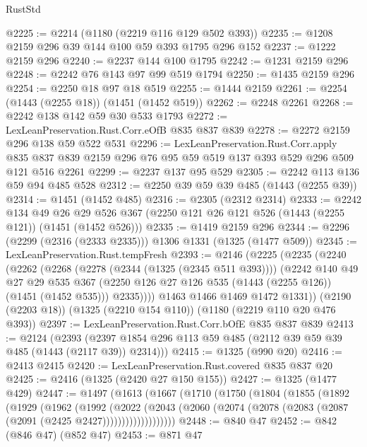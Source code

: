 \begin{lexlean}{RustStd}
\begin{coremodule}
{\begin{coremodule}
{{{{{{{{{@2225 := @2214 (@1180 (@2219 @116 @129 @502 @393))
@2235 := @1208 @2159 @296 @39 @144 @100 @59 @393 @1795 @296 @152
@2237 := @1222 @2159 @296
@2240 := @2237 @144 @100 @1795
@2242 := @1231 @2159 @296
@2248 := @2242 @76 @143 @97 @99 @519 @1794
@2250 := @1435 @2159 @296
@2254 := @2250 @18 @97 @18 @519
@2255 := @1444 @2159
@2261 := @2254 (@1443 (@2255 @18)) (@1451 (@1452 @519))
@2262 := @2248 @2261
@2268 := @2242 @138 @142 @59 @30 @533 @1793
@2272 := LexLeanPreservation.Rust.Corr.eOfB @835 @837 @839
@2278 := @2272 @2159 @296 @138 @59 @522 @531
@2296 := LexLeanPreservation.Rust.Corr.apply
    @835
    @837
    @839
    @2159
    @296
    @76
    @95
    @59
    @519
    @137
    @393
    @529
    @296
    @509
    @121
    @516
    @2261
@2299 := @2237 @137 @95 @529
@2305 := @2242 @113 @136 @59 @94 @485 @528
@2312 := @2250 @39 @59 @39 @485 (@1443 (@2255 @39))
@2314 := @1451 (@1452 @485)
@2316 := @2305 (@2312 @2314)
@2333 := @2242
    @134
    @49
    @26
    @29
    @526
    @367
    (@2250 @121 @26 @121 @526 (@1443 (@2255 @121)) (@1451 (@1452 @526)))
@2335 := @1419 @2159 @296
@2344 := @2296 (@2299 (@2316 (@2333 @2335))) @1306 @1331 (@1325 (@1477 @509))
@2345 := LexLeanPreservation.Rust.tempFresh
@2393 := @2146
    (@2225
      (@2235
        (@2240
          (@2262
            (@2268
              (@2278 (@2344 (@1325 (@2345 @511 @393))))
              (@2242
                @140
                @49
                @27
                @29
                @535
                @367
                (@2250 @126 @27 @126 @535 (@1443 (@2255 @126)) (@1451 (@1452 @535)))
                @2335))))
        @1463
        @1466
        @1469
        @1472
        @1331))
    (@2190 (@2203 @18))
    (@1325 (@2210 @154 @110))
    (@1180 (@2219 @110 @20 @476 @393))
@2397 := LexLeanPreservation.Rust.Corr.bOfE @835 @837 @839
@2413 := @2124
    (@2393 (@2397 @1854 @296 @113 @59 @485 (@2112 @39 @59 @39 @485 (@1443 (@2117 @39)) @2314)))
@2415 := @1325 (@990 @20)
@2416 := @2413 @2415
@2420 := LexLeanPreservation.Rust.covered @835 @837 @20
@2425 := @2416 (@1325 (@2420 @27 @150 @155))
@2427 := @1325 (@1477 @429)
@2447 := @1497
    (@1613
      (@1667
        (@1710
          (@1750
            (@1804
              (@1855
                (@1892
                  (@1929
                    (@1962
                      (@1992
                        (@2022
                          (@2043
                            (@2060
                              (@2074 (@2078 (@2083 (@2087 (@2091 (@2425 @2427)))))))))))))))))))
@2448 := @840 @47
@2452 := @842 (@846 @47) (@852 @47)
@2453 := @871 @47
}}}}}}}}}
\end{coremodule}}
\end{coremodule}
\end{lexlean}
